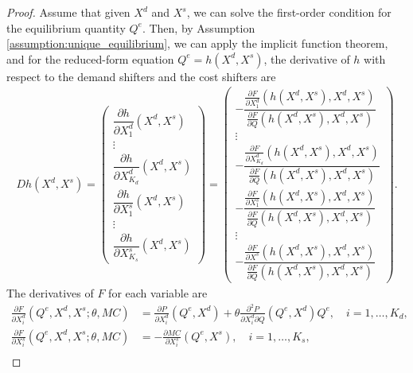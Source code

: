 \documentclass[11pt, a4paper]{article}
\theoremstyle{remark}
\begin{document}
\begin{proof}
Assume that given $X^{d}$ and $X^{s}$, we can solve the first-order condition for the equilibrium quantity $Q^e$.
Then, by Assumption \ref{assumption:unique_equilibrium}, we can apply the implicit function theorem, and for the reduced-form equation $Q^e = h(X^{d}, X^{s})$, the derivative of $h$ with respect to the demand shifters and the cost shifters are
\begin{align}
    Dh(X^{d}, X^{s}) = \begin{pmatrix}
        \dfrac{\partial h}{\partial X^{d}_{1}}(X^{d}, X^{s})\\
        \vdots \\
        \dfrac{\partial h}{\partial X^{d}_{K_d}}(X^{d}, X^{s})\\[1em]
        \dfrac{\partial h}{\partial X^{s}_{1}}(X^{d}, X^{s})\\
        \vdots \\
        \dfrac{\partial h}{\partial X^{s}_{K_s}}(X^{d}, X^{s})
    \end{pmatrix} = \begin{pmatrix}
        -\dfrac{\frac{\partial F}{\partial X^{d}_{1}}(h(X^{d}, X^{s}), X^{d}, X^{s})}{\frac{\partial F}{\partial Q}(h(X^{d}, X^{s}), X^{d}, X^{s})}\\
        \vdots \\
        -\dfrac{\frac{\partial F}{\partial X^{d}_{K_d}}(h(X^{d}, X^{s}), X^{d}, X^{s})}{\frac{\partial F}{\partial Q}(h(X^{d}, X^{s}), X^{d}, X^{s})}\\[1.5em]
        -\dfrac{\frac{\partial F}{\partial X^{s}_{1}}(h(X^{d}, X^{s}), X^{d}, X^{s})}{\frac{\partial F}{\partial Q}(h(X^{d}, X^{s}), X^{d}, X^{s})}\\
        \vdots \\        
        -\dfrac{\frac{\partial F}{\partial X^{s}}(h(X^{d}, X^{s}), X^{d}, X^{s})}{\frac{\partial F}{\partial Q}(h(X^{d}, X^{s}), X^{d}, X^{s})}
    \end{pmatrix}.\label{eq:foc_derivative_demand_supply}
\end{align}
The derivatives of $F$ for each variable are
\begin{align}
    \frac{\partial F}{\partial X^{d}_i}(Q^e, X^{d}, X^{s}; \theta, MC) & =  \frac{\partial P}{\partial X^{d}_{i}}(Q^e, X^{d}) + \theta\frac{\partial^2 P}{\partial X^{d}_{i}\partial Q}(Q^e, X^{d})Q^e, \quad i = 1, \ldots, K_d,\\
    \frac{\partial F}{\partial X^{s}_i}(Q^e, X^{d}, X^{s}; \theta, MC) & =  -\frac{\partial MC}{\partial X^{s}_{i}}(Q^e, X^{s}), \quad i = 1, \ldots, K_s, \\

\end{align}
\end{proof}
\end{document}
